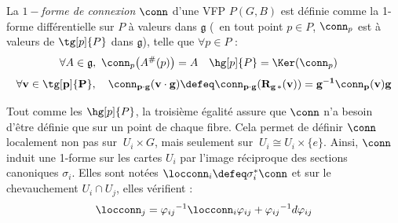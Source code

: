 \begin{definition} \label{def:1-form2conn}
La \emph{$1-$forme de connexion} $\conn$ d'une VFP $P(G,B)$ est définie comme la 1-forme différentielle sur $P$ à valeurs dans $\mathfrak{g}$ (\ie~en tout point $p\in P$, $\conn_p$ est à valeurs de $\tg[p]{P}$ dans $\mathfrak{g}$), telle que $\forall p\in P$ :
\begin{align} \label{eq:1-form2conn}
	\forall A\in \mathfrak{g},\ \conn_p\big(A^\#(p)\big) &= A  &  \hg[p]{P} &= \Ker(\conn_p)
\end{align}
\begin{equation} \label{eq:1-form_G-inv}
	\forall \bf{v}\in\tg[p]{P},\quad \conn_{p\cdot g}(\bf{v}\cdot g) \defeq \conn_{p\cdot g}(R_{g\, *}(\bf{v})) = g^{-1}\conn_p(\bf{v})g
\end{equation}
\skipl

Tout comme les $\hg[p]{P}$, la troisième égalité assure que $\conn$ n'a besoin d'être définie que sur un point de chaque fibre. Cela permet de définir $\conn$ localement non pas sur $\ U_i\times G$, mais seulement sur $\ U_i \cong U_i \times \{e\}$. Ainsi, $\conn$ induit une 1-forme sur les cartes $U_i$ par l'image réciproque des sections canoniques $\sigma_i$. Elles sont notées $\locconn_i \defeq \sigma_i^*\conn$ et sur le chevauchement $U_i\cap U_j$, elles vérifient :
\begin{equation}\label{eq:conn_local}
	\locconn_j = {\varphi_{ij}}^{-1} \locconn_i \varphi_{ij} + {\varphi_{ij}}^{-1} d \varphi_{ij}
\end{equation}
\end{definition}
\skipl


